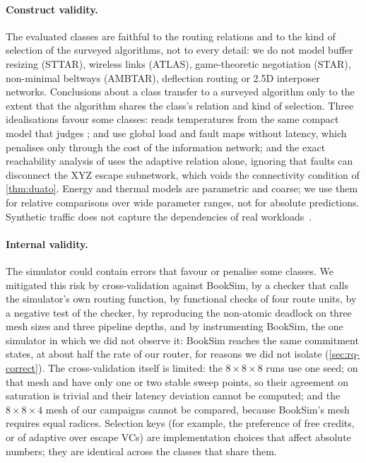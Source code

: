 \paragraph{Construct validity.} The evaluated classes are faithful to the routing relations and to the kind of selection of the surveyed algorithms, not to every detail: we do not model buffer resizing (STTAR), wireless links (ATLAS), game-theoretic negotiation (STAR), non-minimal beltways (AMBTAR), deflection routing or 2.5D interposer networks. Conclusions about a class transfer to a surveyed algorithm only to the extent that the algorithm shares the class's relation and kind of selection. Three idealisations favour some classes:  reads temperatures from the same compact model that judges ;  and  use global load and fault maps without latency, which  penalises only through the cost of the information network; and the exact reachability analysis of  uses the adaptive relation alone, ignoring that faults can disconnect the XYZ escape subnetwork, which voids the connectivity condition of \cref{thm:duato}. Energy and thermal models are parametric and coarse; we use them for relative comparisons over wide parameter ranges, not for absolute predictions. Synthetic traffic does not capture the dependencies of real workloads~\cite{hestness2010netrace,malikov2025traffic}.

\paragraph{Internal validity.} The simulator could contain errors that favour or penalise some classes. We mitigated this risk by cross-validation against BookSim, by a checker that calls the simulator's own routing function, by functional checks of four route units, by a negative test of the checker, by reproducing the non-atomic deadlock on three mesh sizes and three pipeline depths, and by instrumenting BookSim, the one simulator in which we did not observe it: BookSim reaches the same commitment states, at about half the rate of our router, for reasons we did not isolate (\cref{sec:rq-correct}). The cross-validation itself is limited: the $8\times8\times8$ runs use one seed; on that mesh  and  have only one or two stable sweep points, so their agreement on saturation is trivial and their latency deviation cannot be computed; and the $8\times8\times4$ mesh of our campaigns cannot be compared, because BookSim's mesh requires equal radices. Selection keys (for example, the preference of free credits, or of adaptive over escape VCs) are implementation choices that affect absolute numbers; they are identical across the classes that share them.

